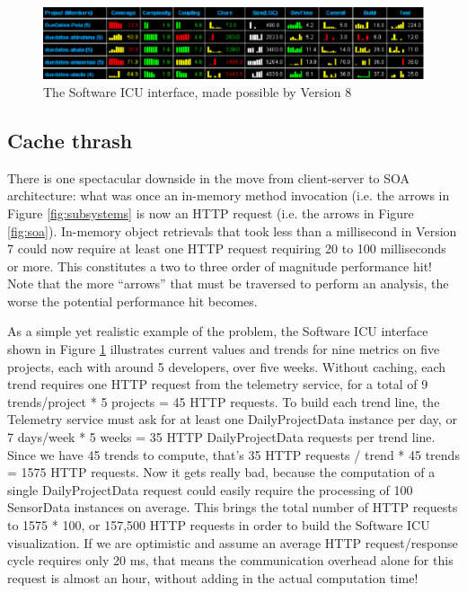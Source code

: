\documentclass[conference,compsoc]{IEEEtran}
\begin{document}
\begin{figure}[ht]
  \center
  \includegraphics[width=1.0\textwidth]{icu.eps}
  \caption{The Software ICU interface, made possible by Version 8}
  \label{fig:icu}
\end{figure} 

\subsection{Cache thrash}
\label{sec:v8cache}

There is one spectacular downside in the move from client-server to SOA
architecture: what was once an in-memory method invocation (i.e. the arrows
in Figure \ref{fig:subsystems} is now an HTTP request (i.e. the arrows in
Figure \ref{fig:soa}).  In-memory object retrievals that took less than a
millisecond in Version 7 could now require at least one HTTP request
requiring 20 to 100 milliseconds or more.  This constitutes a two to three
order of magnitude performance hit!  Note that the more ``arrows'' that must be traversed 
to perform an analysis, the worse the potential performance hit becomes. 

As a simple yet realistic example of the problem, the Software ICU
interface shown in Figure \ref{fig:icu} illustrates current values and
trends for nine metrics on five projects, each with around 5 developers,
over five weeks. Without caching, each trend requires one HTTP request from
the telemetry service, for a total of 9 trends/project * 5 projects = 45
HTTP requests.  To build each trend line, the Telemetry service must ask
for at least one DailyProjectData instance per day, or 7 days/week * 5
weeks = 35 HTTP DailyProjectData requests per trend line.  Since we have 45
trends to compute, that's 35 HTTP requests / trend * 45 trends = 1575 HTTP
requests.  Now it gets really bad, because the computation of a single
DailyProjectData request could easily require the processing of 100
SensorData instances on average.  This brings the total number of HTTP
requests to 1575 * 100, or 157,500 HTTP requests in order to build the
Software ICU visualization.  If we are optimistic and assume an average
HTTP request/response cycle requires only 20 ms, that means the
communication overhead alone for this request is almost an hour, without
adding in the actual computation time!
\end{document}
